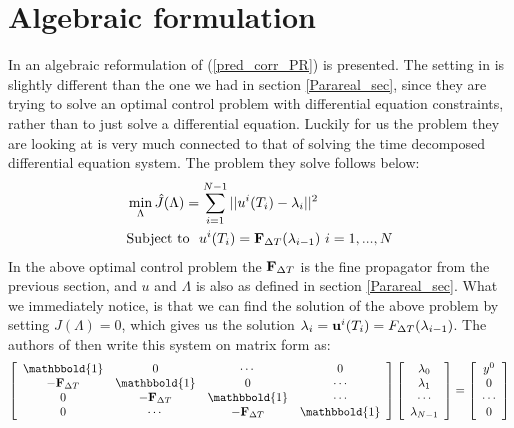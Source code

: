\section{Algebraic formulation}
In \cite{maday2002parareal} an algebraic reformulation of (\ref{pred_corr_PR}) is presented. The setting in \cite{maday2002parareal} is slightly different than the one we had in section \ref{Parareal_sec}, since they are trying to solve an optimal control problem with differential equation constraints, rather than to just solve a differential equation. Luckily for us the problem they are looking at is very much connected to that of solving the time decomposed differential equation system. The problem they solve follows below:
\begin{align*}
&\min_{\Lambda}\hat{J}(\Lambda) = \sum_{i=1}^{N-1} ||u^{i}(T_{i})-\lambda_{i}||^2 \\
&\textrm{Subject to } \ u^{i}(T_{i}) = \bold F_{\Delta T}(\lambda_{i-1}) \ i=1,...,N
\end{align*}
In the above optimal control problem the $\bold F_{\Delta T}$ is the fine propagator from the previous section, and $u$ and $\Lambda$ is also as defined in section \ref{Parareal_sec}. What we immediately notice, is that we can find the solution of the above problem by setting $J(\Lambda)=0$, which gives us the solution $\lambda_{i}=\bold  u^{i}(T_{i})=F_{\Delta T}(\lambda_{i-1})$. The authors of \cite{maday2002parareal} then write this system on matrix form as:
\begin{align}
  \left[ \begin{array}{cccc}
   \mathbbold{1} & 0 & \cdots & 0 \\  
   -\bold{F}_{\Delta T} & \mathbbold{1} & 0 & \cdots \\ 
   0 &-\bold{F}_{\Delta T} & \mathbbold{1}  & \cdots \\
   0 &\cdots &-\bold{F}_{\Delta T} & \mathbbold{1}  \\
   \end{array}  \right] 
   \left[ \begin{array}{c}
   \lambda_0 \\
   \lambda_1 \\
   \cdots \\
   \lambda_{N-1} \\
   \end{array}  \right] =
   \left[ \begin{array}{c}
   y^0 \\
   0 \\
   \cdots \\
   0 \\
   \end{array}  \right] \label{vir_mat_form_sys }
\end{align}
